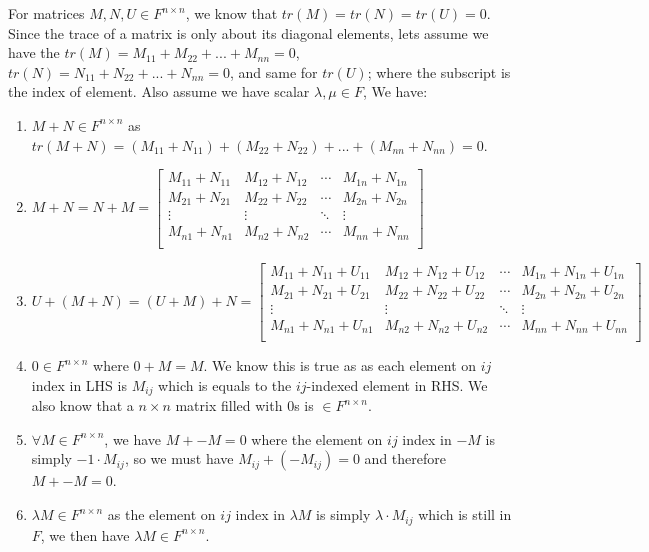 \documentclass[11pt]{article}
\begin{document}
For matrices $M, N, U \in F^{n \times n}$, we know that $tr(M) = tr(N) = tr(U) = 0$. Since the trace of a matrix is only about its diagonal elements, lets assume we have the $tr(M) = M_{11} + M_{22} + ... +  M_{nn} = 0$, $tr(N) = N_{11} + N_{22} + ... +  N_{nn} = 0$, and same for $tr(U)$; where the subscript is the index of element. Also assume we have scalar $\lambda, \mu \in F$, We have:

\begin{enumerate}
    \item $M + N \in  F^{n \times n}$ as $tr(M + N) = (M_{11} + N_{11}) + (M_{22} + N_{22}) +  ... + (M_{nn} + N_{nn}) = 0$.
    \item $M + N = N + M = \begin{bmatrix}
        M_{11} + N_{11} & M_{12} + N_{12} & \cdots &M_{1n} + N_{1n} \\
        M_{21} + N_{21} & M_{22} + N_{22} & \cdots &M_{2n} + N_{2n} \\
        \vdots & \vdots & \ddots & \vdots \\
        M_{n1} + N_{n1} & M_{n2} + N_{n2} & \cdots &M_{nn} + N_{nn} \\
    \end{bmatrix}$
    \item $U + (M + N) = (U + M) + N = \begin{bmatrix}
        M_{11} + N_{11}+ U_{11} & M_{12} + N_{12}+ U_{12} & \cdots & M_{1n} + N_{1n}+ U_{1n} \\
        M_{21} + N_{21} + U_{21} & M_{22} + N_{22} + U_{22} & \cdots&  M_{2n} + N_{2n} + U_{2n} \\
        \vdots & \vdots & \ddots & \vdots \\
        M_{n1} + N_{n1}+U_{n1} & M_{n2} + N_{n2}+U_{n2} & \cdots & M_{nn} + N_{nn}+U_{nn} \\
    \end{bmatrix}$
    \item $0 \in  F^{n \times n}$ where $0 + M = M$. We know this is true as as each element on $ij$ index in LHS is $M_{ij}$ which is equals to the $ij$-indexed element in RHS. We also know that a $n \times n$ matrix filled with $0$s is $\in  F^{n \times n}$.
    \item $\forall M \in F^{n \times n}$, we have $M + -M = 0$ where the element on $ij$ index in $-M$ is simply $-1 \cdot M_{ij}$, so we must have $M_{ij} + (-M_{ij}) = 0$ and therefore $M + -M = 0$.
    \item $\lambda M \in F^{n \times n}$ as the element on $ij$ index in $\lambda M$ is simply $\lambda \cdot M_{ij}$ which is still in $F$, we then have $\lambda M  \in F^{n \times n}$.

\end{enumerate}
\end{document}
